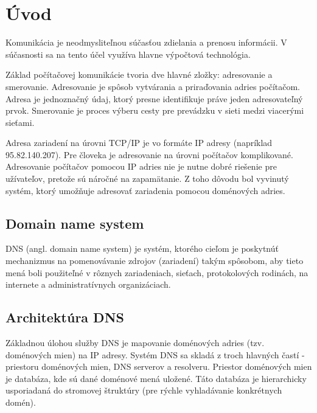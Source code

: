 
%


\newcommand*{\addNewChapter}[2][1]{\addtocounter{chapterCounter}{#1}\chapter{#2}\label{#2}}


\addNewChapter{Úvod}
Komunikácia je neodmysliteľnou súčasťou zdielania a prenosu informácii. V súčasnosti sa na tento účel využíva hlavne výpočtová technológia.

Základ počítačovej komunikácie tvoria dve hlavné zložky: adresovanie a smerovanie. Adresovanie je spôsob vytvárania a priraďovania adries počítačom. 
Adresa je jednoznačný údaj, ktorý presne identifikuje práve jeden adresovateľný prvok. Smerovanie je proces výberu cesty pre prevádzku v sieti medzi viacerými sieťami. \cite{Smerovanie}

Adresa zariadení na úrovni TCP/IP je vo formáte IP adresy (napríklad 95.82.140.207). 
Pre človeka je adresovanie na úrovni počítačov komplikované. Adresovanie počítačov pomocou IP adries nie je nutne dobré riešenie pre užívateľov, pretože sú náročné na zapamätanie.
Z toho dôvodu bol vyvinutý systém, ktorý umožňuje adresovať zariadenia pomocou doménových adries.

\section{Domain name system}
\label{Domain name system}
DNS (angl. domain name system) je systém, ktorého cieľom je poskytnúť mechanizmus na pomenovávanie
zdrojov (zariadení) takým spôsobom, aby tieto mená boli použiteľné v rôznych zariadeniach, sieťach, protokolových rodinách, 
na internete a administratívnych organizáciach. \cite{rfc1035} 

\section{Architektúra DNS}
Základnou úlohou služby DNS je mapovanie doménových adries (tzv. doménových mien) na IP adresy. 
Systém DNS sa skladá z troch hlavných častí - priestoru doménových mien, DNS serverov a resolveru. Priestor doménových mien je databáza, kde sú dané doménové mená uložené. 
Táto databáza je hierarchicky usporiadaná do stromovej štruktúry (pre rýchle vyhladávanie konkrétnych domén). \cite{Matoušek}

